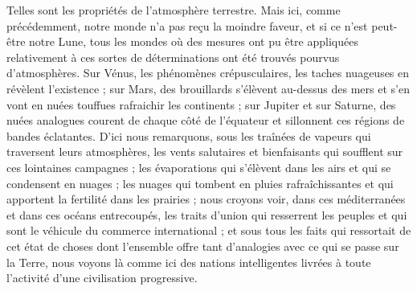 \documentclass[a4paper, 11pt, oneside]{article}
\begin{document}
Telles sont les propriétés de l'atmosphère terrestre. Mais ici, comme précédemment, notre monde n'a pas reçu la moindre faveur, et si ce n'est peut-être notre Lune, tous les mondes où des mesures ont pu être appliquées relativement à ces sortes de déterminations ont été trouvés pourvus d'atmosphères. Sur Vénus, les phénomènes crépusculaires, les taches nuageuses en révèlent l'existence ; sur Mars, des brouillards s'élèvent au-dessus des mers et s'en vont en nuées touffues rafraichir les continents ; sur Jupiter et sur Saturne, des nuées analogues courent de chaque côté de l'équateur et sillonnent ces régions de bandes éclatantes. D'ici nous remarquons, sous les traînées de vapeurs qui traversent leurs atmosphères, les vents salutaires et bienfaisants qui soufflent sur ces lointaines campagnes ; les évaporations qui s'élèvent dans les airs et qui se condensent en nuages ; les nuages qui tombent en pluies rafraîchissantes et qui apportent la fertilité dans les prairies ; nous croyons voir, dans ces méditerranées et dans ces océans entrecoupés, les traits d'union qui resserrent les peuples et qui sont le véhicule du commerce international ; et sous tous les faits qui ressortait de cet état de choses dont l'ensemble offre tant d'analogies avec ce qui se passe sur la Terre, nous voyons là comme ici des nations intelligentes livrées à toute l'activité d'une civilisation progressive.
\end{document}
